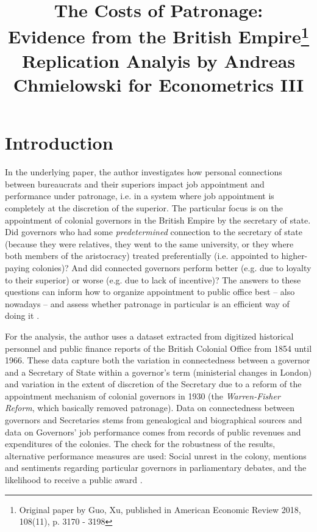 \documentclass[a4paper]{article}\usepackage[]{graphicx}\usepackage[]{xcolor}
\title{The Costs of Patronage:\\ Evidence from the British Empire\thanks{Original paper by Guo, Xu, published in American Economic Review 2018, 108(11), p. 3170 - 3198} \\ \vskip 0.4cm \normalsize Replication Analyis by Andreas Chmielowski for Econometrics III}
\date{\vspace{-5ex}}
\begin{document}


\maketitle

\section{Introduction}
\hspace*{5mm} In the underlying paper, the author investigates how personal connections between bureaucrats and their superiors impact job appointment and performance under patronage, i.e. in a system where job appointment is completely at the discretion of the superior. The particular focus is on the appointment of colonial governors in the British Empire by the secretary of state. Did governors who had some \textit{predetermined} connection to the secretary of state (because they were relatives, they went to the same university, or they where both members of the aristocracy) treated preferentially (i.e. appointed to higher-paying colonies)? And did connected governors perform better (e.g. due to loyalty to their superior) or worse (e.g. due to lack of incentive)? The answers to these questions can inform how to organize appointment to public office best -- also nowadays -- and assess whether patronage in particular is an efficient way of doing it \parencite{guoxu2018}.

\hspace*{5mm} For the analysis, the author uses a dataset extracted from digitized historical personnel and public finance reports of the British Colonial Office from 1854 until 1966. These data capture both the variation in connectedness between a governor and a Secretary of State within a governor's term (ministerial changes in London) and variation in the extent of discretion of the Secretary due to a reform of the appointment mechanism of colonial governors in 1930 (the \textit{Warren-Fisher Reform}, which basically removed patronage). Data on connectedness between governors and Secretaries stems from genealogical and biographical sources and data on Governors' job performance comes from records of public revenues and expenditures of the colonies. The check for the robustness of the results, alternative performance measures are used: Social unrest in the colony, mentions and sentiments regarding particular governors in parliamentary debates, and the likelihood to receive a public award \parencite[p.3171 ff.]{guoxu2018}. 
\end{document}
